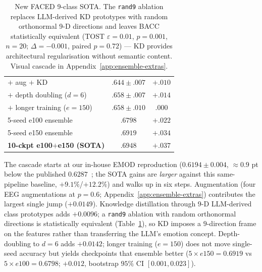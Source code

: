 \begin{table}[h]
\begin{minipage}{0.55\linewidth}
\begin{tabular}{@{}lcc@{}}
$+$ aug $+$ KD                        & $.644\!\pm\!.007$ & $+.010$ \\
$+$ depth doubling ($d{=}6$)          & $.658\!\pm\!.007$ & $+.014$ \\
$+$ longer training ($e{=}150$)       & $.658\!\pm\!.010$ & $.000$ \\
\midrule
5-seed e100 ensemble                  & $.6798$ & $+.022$ \\
5-seed e150 ensemble                  & $.6919$ & $+.034$ \\
\textbf{10-ckpt e100$+$e150 (SOTA)}   & $\mathbf{.6948}$ & $\mathbf{+.037}$ \\
\bottomrule
\end{tabular}
\end{minipage}
\caption{New FACED 9-class SOTA. The \texttt{rand9} ablation replaces
LLM-derived KD prototypes with random orthonormal 9-D directions and
leaves BACC statistically equivalent (TOST $\varepsilon{=}0.01$,
$p{=}0.001$, $n{=}20$; $\Delta{=}{-}0.001$, paired $p{=}0.72$) --- KD
provides architectural regularisation without semantic content. Visual
cascade in Appendix~\ref{app:ensemble-extras}.}
\label{tab:sota}
\end{table}

The cascade starts at our in-house EMOD reproduction ($0.6194 \pm 0.004$,
${\approx}0.9$ pt below the published $0.6287$~\citep{chen2025emod}; the
SOTA gains are \emph{larger} against this same-pipeline baseline,
$+9.1\%$/$+12.2\%$) and walks up in six steps. Augmentation (four EEG augmentations at
$p{=}0.6$; Appendix~\ref{app:ensemble-extras}) contributes the
largest single jump ($+0.0149$). Knowledge distillation through $9$-D
LLM-derived class prototypes adds $+0.0096$; a \texttt{rand9} ablation
with random orthonormal directions is statistically equivalent
(Table~\ref{tab:sota}), so KD imposes a
$9$-direction frame on the features rather than transferring the LLM's
emotion concept. Depth-doubling to $d{=}6$
adds $+0.0142$; longer training ($e{=}150$) does not move single-seed
accuracy but yields checkpoints that ensemble better ($5{\times}e150{=}0.6919$
vs $5{\times}e100{=}0.6798$; $+0.012$, bootstrap $95\%$ CI $[0.001,0.023]$).

